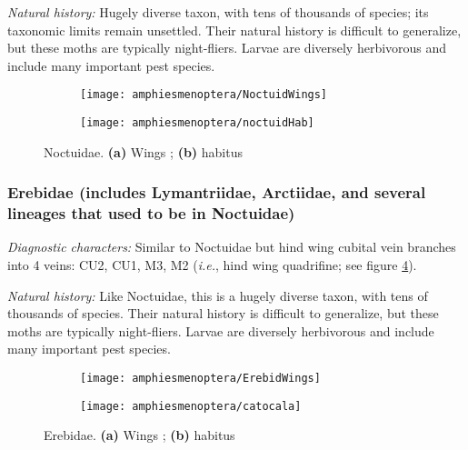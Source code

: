 \noindent{}\textit{Natural history:} Hugely diverse taxon, with tens of thousands of species; its taxonomic limits remain unsettled. Their natural history is difficult to generalize, but these moths are typically night-fliers. Larvae are diversely herbivorous and include many important pest species.

\begin{figure}[ht!]
    \centering
    \begin{subfigure}[ht!]{0.37\textwidth}
        \texttt{[image: amphiesmenoptera/NoctuidWings]}
        \caption{}
        \label{fig:noctuid1}
    \end{subfigure}
    \qquad
    \begin{subfigure}[ht!]{0.5\textwidth}
        \texttt{[image: amphiesmenoptera/noctuidHab]}
        \caption{}
        \label{fig:noctuid2}
    \end{subfigure}
    \caption{Noctuidae. \textbf{(a)} Wings \citep[][Fig. 445]{bhlitem16791elementary}; \textbf{(b)} habitus \citep[Modified from Fig. 14 in][]{bhlitem128144}}\label{fig:noctuids}
\end{figure}

\subsubsection{Erebidae (includes Lymantriidae, Arctiidae, and several lineages that used to be in Noctuidae)}
\noindent{}\textit{Diagnostic characters:} Similar to Noctuidae but hind wing cubital vein branches into 4 veins: CU2, CU1, M3, M2 (\textit{i.e.}, hind wing quadrifine; see figure \ref{fig:erebid1}).\vspace{3mm}

\noindent{}\textit{Natural history:} Like Noctuidae, this is a hugely diverse taxon, with tens of thousands of species. Their natural history is difficult to generalize, but these moths are typically night-fliers. Larvae are diversely herbivorous and include many important pest species.\vspace{3mm}

\begin{figure}[ht!]
    \centering
    \begin{subfigure}[ht!]{0.36\textwidth}
        \texttt{[image: amphiesmenoptera/ErebidWings]}
        \caption{}
        \label{fig:erebid1}
    \end{subfigure}
    \qquad
    \begin{subfigure}[ht!]{0.5\textwidth}
        \texttt{[image: amphiesmenoptera/catocala]}
        \caption{}
        \label{fig:erebid2}
    \end{subfigure}
    \caption{Erebidae. \textbf{(a)} Wings \citep[][Fig. 450]{bhlitem16791elementary}; \textbf{(b)} habitus \citep[Modified from Fig. 53 in][]{bhlitem118262}}\label{fig:erebids}
\end{figure}

